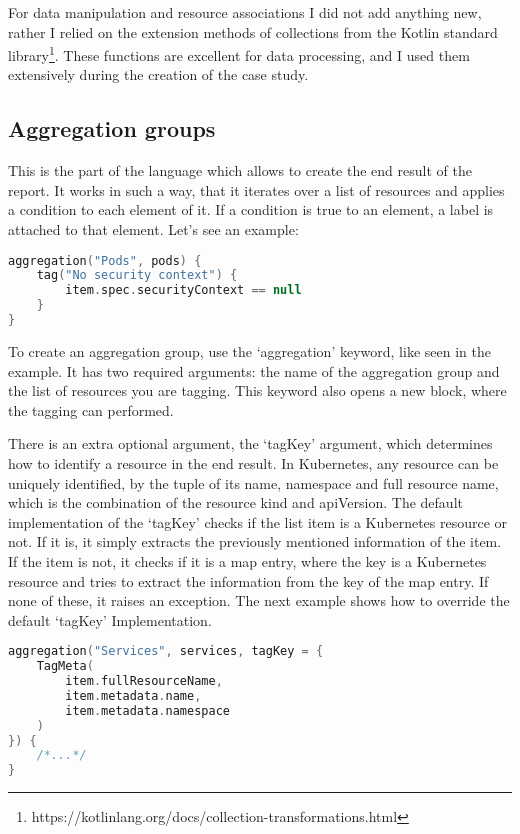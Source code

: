For data manipulation and resource associations I did not add anything new, rather I relied on the extension methods of collections from the Kotlin standard library\footnote{https://kotlinlang.org/docs/collection-transformations.html}. These functions are excellent for data processing, and I used them extensively during the creation of the case study.

\subsection{Aggregation groups}

This is the part of the language which allows to create the end result of the report. It works in such a way, that it iterates over a list of resources and applies a condition to each element of it. If a condition is true to an element, a label is attached to that element. Let's see an example:

\begin{minipage}{\linewidth}
\begin{lstlisting}[caption={Aggregation group example},language=Kotlin,label=code:aggregation_group]
aggregation("Pods", pods) {
    tag("No security context") {
        item.spec.securityContext == null
    }
}
\end{lstlisting}
\end{minipage}

To create an aggregation group, use the `aggregation' keyword, like seen in the example. It has two required arguments: the name of the aggregation group and the list of resources you are tagging. This keyword also opens a new block, where the tagging can performed.

There is an extra optional argument, the `tagKey' argument, which determines how to identify a resource in the end result. In Kubernetes, any resource can be uniquely identified, by the tuple of its name, namespace and full resource name, which is the combination of the resource kind and apiVersion. The default implementation of the `tagKey' checks if the list item is a Kubernetes resource or not. If it is, it simply extracts the previously mentioned information of the item. If the item is not, it checks if it is a map entry, where the key is a Kubernetes resource and tries to extract the information from the key of the map entry. If none of these, it raises an exception. The next example shows how to override the default `tagKey' Implementation.

\begin{lstlisting}[caption={Override tagKey},language=Kotlin,label=code:tagkey]
aggregation("Services", services, tagKey = {
    TagMeta(
        item.fullResourceName,
        item.metadata.name,
        item.metadata.namespace
    )
}) {
    /*...*/
}
\end{lstlisting}

